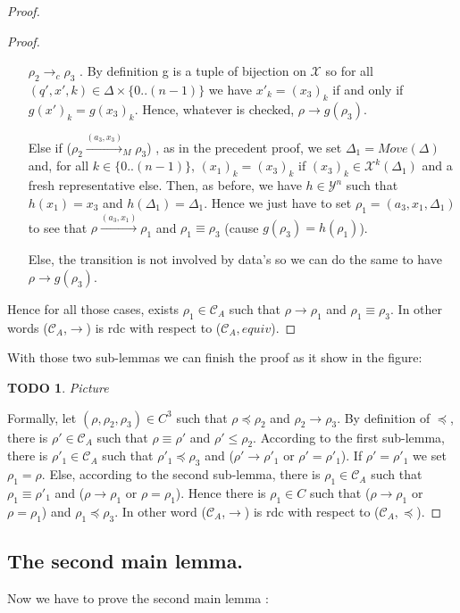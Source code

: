 \documentclass[a4paper,10pt]{report}
\newtheorem{td}{TODO}
\theoremstyle{remark}
\newcommand{\seg}[1]{\{#1\}}
\newcommand{\ts}{\seg{0 .. (n-1)}}
\newcommand{\C}{\mathcal{C}_{A}}
\newcommand{\Xa}{\mathcal{X}}
\newcommand{\Y}{\mathcal{Y}^{n}}
\begin{document}
\begin{proof}
\begin{proof}
    \begin{itemize}
    \item [$\rho_2 \rightarrow_{c} \rho_3$]. By definition g is a tuple of bijection on $\Xa$ so for all $(q',x',k) \in \Delta \times \ts$ we have 
    $x'_k = (x_3)_k$ if and only if  $g(x')_k = {g(x_3)}_k$. Hence, whatever is checked, $\rho \rightarrow g(\rho_3)$.  
    \item [Else if ($\rho_2 \xrightarrow{(a_3,x_3)}_{M} \rho_3$)], as in the precedent proof, we set $\Delta_1 = Move(\Delta)$ and, for all $k \in \ts$, ${(x_1)}_k = {(x_3)}_k$ if ${(x_3)}_k \in \Xa^k(\Delta_1)$ and a fresh representative else.
     Then, as before, we have $h \in \Y$ such that $h(x_1) = x_3$ and $h(\Delta_1) = \Delta_1$.
     Hence we just have to set $\rho_1 = (a_3,x_1,\Delta_1)$ to see that $\rho \xrightarrow{(a_3,x_1)} \rho_1$ and $\rho_1 \equiv \rho_3$ (cause $g(\rho_3) = h(\rho_1)$).
    \item [Else,] the transition is not involved by data's so we can do the same to have $\rho \rightarrow g(\rho_3)$.
    \end{itemize}
    Hence for all those cases, exists $\rho_1 \in \C$ such that $\rho \xrightarrow{} \rho_1$ and $\rho_1 \equiv \rho_3$. 
    In other words ($\C$,$\rightarrow$) is rdc with respect to ($\C,equiv$).
  \end{proof}
  With those two sub-lemmas we can finish the proof as it show in the figure: 
  \begin{td} 
   Picture
  \end{td}
  Formally, let $(\rho,\rho_2,\rho_3) \in C^3 $ such that $ \rho \preceq \rho_2 $ and $ \rho_2 \rightarrow \rho_3$.
  By definition of $\preceq$, there is $\rho' \in \C$ such that $\rho \equiv \rho'$ and $\rho' \leq \rho_2$.
  According to the first sub-lemma, there is $\rho'_1 \in \C$ such that $\rho'_1 \preceq \rho_3$ and ($\rho' \rightarrow \rho'_1$ or $\rho' = \rho'_1$).
  If $\rho' = \rho'_1$ we set $\rho_1 = \rho$.
  Else, according to the second sub-lemma, there is $\rho_1 \in \C$ such that $\rho_1 \equiv \rho'_1$ and ($\rho \rightarrow \rho_1$ or $\rho =\rho_1$).
  Hence there is $\rho_1 \in C $ such that ($\rho \rightarrow \rho_1$ or $\rho = \rho_1$) and $\rho_1 \preceq \rho_3$.
  In other word ($\C$,$\rightarrow$) is rdc with respect to ($\C,\preceq$).

\end{proof}

\subsection{The second main lemma.}
Now we have to prove the second main lemma :
\end{document}
